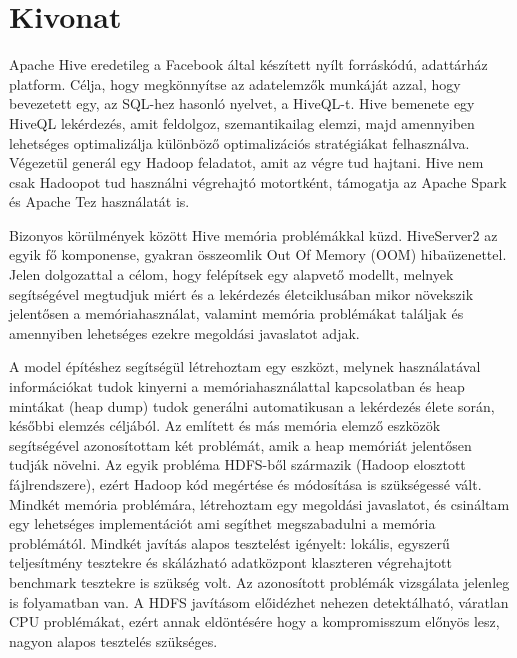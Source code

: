 \setcounter{page}{1}

\selecthungarian

\chapter*{Kivonat}

Apache Hive eredetileg a Facebook által készített nyílt forráskódú, adattárház platform. Célja, hogy megkönnyítse az adatelemzők munkáját azzal, hogy bevezetett egy, az SQL-hez hasonló nyelvet, a HiveQL-t. Hive bemenete egy HiveQL lekérdezés, amit feldolgoz, szemantikailag elemzi, majd amennyiben lehetséges optimalizálja különböző optimalizációs stratégiákat felhasználva. Végezetül generál egy Hadoop feladatot, amit az végre tud hajtani. Hive nem csak Hadoopot tud használni végrehajtó motortként, támogatja az Apache Spark és Apache Tez használatát is. 

Bizonyos körülmények között Hive memória problémákkal küzd. HiveServer2 az egyik fő komponense, gyakran összeomlik Out Of Memory (OOM) hibaüzenettel. Jelen dolgozattal a célom, hogy felépítsek egy alapvető modellt, melnyek segítségével megtudjuk miért és a lekérdezés életciklusában mikor növekszik jelentősen a memóriahasználat, valamint memória problémákat találjak és amennyiben lehetséges ezekre megoldási javaslatot adjak.

A model építéshez segítségül létrehoztam egy eszközt, melynek használatával információkat tudok kinyerni a memóriahasználattal kapcsolatban és heap mintákat (heap dump) tudok generálni automatikusan a lekérdezés élete során, későbbi elemzés céljából. Az említett és más memória elemző eszközök segítségével azonosítottam két problémát, amik a heap memóriát jelentősen tudják növelni. Az egyik probléma HDFS-ből származik (Hadoop elosztott fájlrendszere), ezért Hadoop kód megértése és módosítása is szükségessé vált. Mindkét memória problémára, létrehoztam egy megoldási javaslatot, és csináltam egy lehetséges implementációt ami segíthet megszabadulni a memória problémától. Mindkét javítás alapos tesztelést igényelt: lokális, egyszerű teljesítmény tesztekre és skálázható adatközpont klaszteren végrehajtott benchmark tesztekre is szükség volt. Az azonosított problémák vizsgálata jelenleg is folyamatban van. A HDFS javításom előidézhet nehezen detektálható, váratlan CPU problémákat, ezért annak eldöntésére hogy a kompromisszum előnyös lesz, nagyon alapos tesztelés szükséges.


